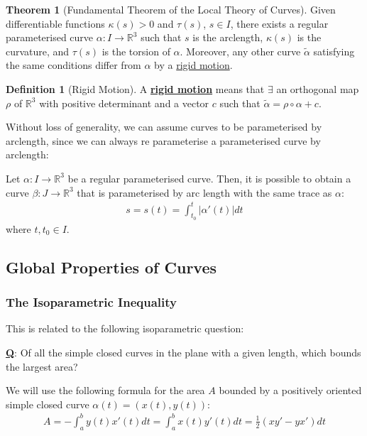 \documentclass[11pt]{scrartcl}
\newcommand{\R}[0]{\mathbb{R}}
\theoremstyle{definition}
\newtheorem{theorem}{Theorem}
\newtheorem{definition}{Definition}
\theoremstyle{remark}
\newcommand{\dfn}[1]{\textbf{\underline{#1}}}
\newcommand{\idx}[2]{\int_{#1}^{#2}}
\begin{document}
{\begin{theorem}[Fundamental Theorem of the Local Theory of Curves]
	Given differentiable functions  $\kappa(s) > 0$ and $\tau(s)$, $s \in I$, there exists a regular parameterised curve $\alpha: I \rightarrow \R^3$ such that $s$ is the arclength, $\kappa(s)$ is the curvature, and $\tau(s)$ is the torsion of $\alpha$. Moreover, any other curve $\widetilde{\alpha}$ satisfying the same conditions differ from $\alpha$ by a \underline{rigid motion}. 
\end{theorem}

\begin{definition}[Rigid Motion]
	A \dfn{rigid motion} means that $\exists$ an orthogonal map $\rho$ of $\R^3$ with positive determinant and a vector $c$ such that $\widetilde{\alpha} = \rho \circ \alpha + c$. 
\end{definition}

Without loss of generality, we can assume curves to be parameterised by arclength, since we can always re parameterise a parameterised curve by arclength: 

Let $\alpha: I \rightarrow \R^3$ be a regular parameterised curve. Then, it is possible to obtain a curve $\beta: J \rightarrow \R^3$ that is parameterised by arc length with the same trace as $\alpha$: 
\begin{align*}
	s = s(t) = \idx{t_0}{t} | \alpha'(t) | dt
\end{align*}
where $t, t_0 \in I$. 

\subsection{Global Properties of Curves}

\subsubsection{The Isoparametric Inequality}
This is related to the following isoparametric question: 
\begin{center}
	\textbf{\underline{Q}}: Of all the simple closed curves in the plane with a given length, which bounds the largest area? 
\end{center}
We will use the following formula for the area $A$ bounded by a positively oriented simple closed curve $\alpha(t) = (x(t), y(t))$:
\begin{align*}
	A = - \idx{a}{b} y(t) x'(t) dt = \idx{a}{b} x(t)y'(t) dt = \frac{1}{2} (xy' - yx') dt 
\end{align*}

}
\end{document}

